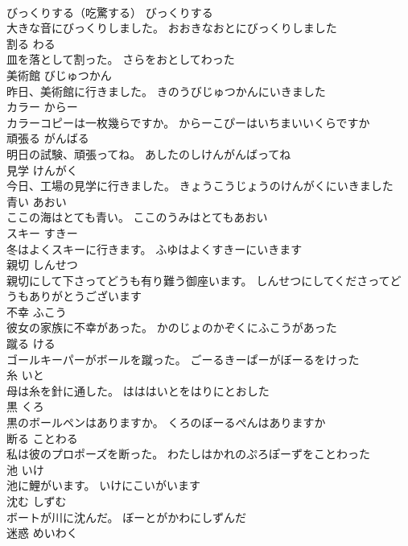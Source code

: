 \documentclass[8pt]{extreport}
\begin{document}
\begin{CJK}{UTF8}{min}
\\	びっくりする（吃驚する）	びっくりする	
\\	大きな音にびっくりしました。	おおきなおとにびっくりしました	
\\	割る	わる	
\\	皿を落として割った。	さらをおとしてわった	
\\	美術館	びじゅつかん	
\\	昨日、美術館に行きました。	きのうびじゅつかんにいきました	
\\	カラー	からー	
\\	カラーコピーは一枚幾らですか。	からーこぴーはいちまいいくらですか	
\\	頑張る	がんばる	
\\	明日の試験、頑張ってね。	あしたのしけんがんばってね	
\\	見学	けんがく	
\\	今日、工場の見学に行きました。	きょうこうじょうのけんがくにいきました	
\\	青い	あおい	
\\	ここの海はとても青い。	ここのうみはとてもあおい	
\\	スキー	すきー	
\\	冬はよくスキーに行きます。	ふゆはよくすきーにいきます	
\\	親切	しんせつ	
\\	親切にして下さってどうも有り難う御座います。	しんせつにしてくださってどうもありがとうございます	
\\	不幸	ふこう	
\\	彼女の家族に不幸があった。	かのじょのかぞくにふこうがあった	
\\	蹴る	ける	
\\	ゴールキーパーがボールを蹴った。	ごーるきーぱーがぼーるをけった	
\\	糸	いと	
\\	母は糸を針に通した。	はははいとをはりにとおした	
\\	黒	くろ	
\\	黒のボールペンはありますか。	くろのぼーるぺんはありますか	
\\	断る	ことわる	
\\	私は彼のプロポーズを断った。	わたしはかれのぷろぽーずをことわった	
\\	池	いけ	
\\	池に鯉がいます。	いけにこいがいます	
\\	沈む	しずむ	
\\	ボートが川に沈んだ。	ぼーとがかわにしずんだ	
\\	迷惑	めいわく	

\end{CJK}
\end{document}

